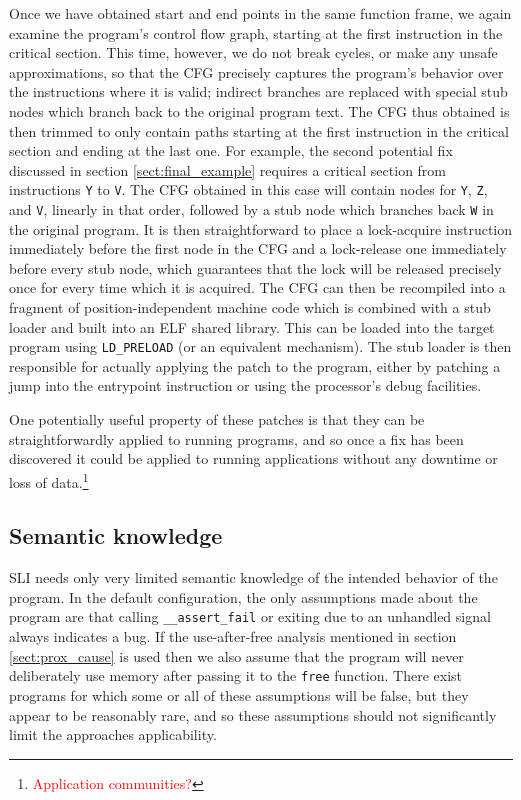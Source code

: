 \documentclass[10pt,twocolumn,preprint,natbib,authoryear]{sigplanconf}
\newcommand{\editorial}[1]{\textcolor{red}{\footnote{\textcolor{red}{#1}}}}
\begin{document}
Once we have obtained start and end points in the same function frame,
we again examine the program's control flow graph, starting at the
first instruction in the critical section.  This time, however, we do
not break cycles, or make any unsafe approximations, so that the CFG
precisely captures the program's behavior over the instructions where
it is valid; indirect branches are replaced with special stub nodes
which branch back to the original program text.  The CFG thus obtained
is then trimmed to only contain paths starting at the first
instruction in the critical section and ending at the last one.  For
example, the second potential fix discussed in section
\ref{sect:final_example} requires a critical section from instructions
\verb|Y| to \verb|V|.  The CFG obtained in this case will contain
nodes for \verb|Y|, \verb|Z|, and \verb|V|, linearly in that order,
followed by a stub node which branches back \verb|W| in the original
program.  It is then straightforward to place a lock-acquire
instruction immediately before the first node in the CFG and a
lock-release one immediately before every stub node, which guarantees
that the lock will be released precisely once for every time which it
is acquired.  The CFG can then be recompiled into a fragment of
position-independent machine code which is combined with a stub loader
and built into an ELF shared library.  This can be loaded into the
target program using \verb|LD_PRELOAD| (or an equivalent mechanism).
The stub loader is then responsible for actually applying the patch to
the program, either by patching a jump into the entrypoint instruction
or using the processor's debug facilities.

One potentially useful property of these patches is that they can be
straightforwardly applied to running programs, and so once a fix has
been discovered it could be applied to running applications without
any downtime or loss of data.\editorial{Application communities?}

\subsection{Semantic knowledge}
\label{sect:semanticknowledge}
SLI needs only very limited semantic knowledge of the intended
behavior of the program.  In the default configuration, the only
assumptions made about the program are that calling
\verb|__assert_fail| or exiting due to an unhandled signal always
indicates a bug.  If the use-after-free analysis mentioned in section
\ref{sect:prox_cause} is used then we also assume that the program
will never deliberately use memory after passing it to the \verb|free|
function.  There exist programs for which some or all of these
assumptions will be false, but they appear to be reasonably rare, and
so these assumptions should not significantly limit the approaches
applicability.
\end{document}
